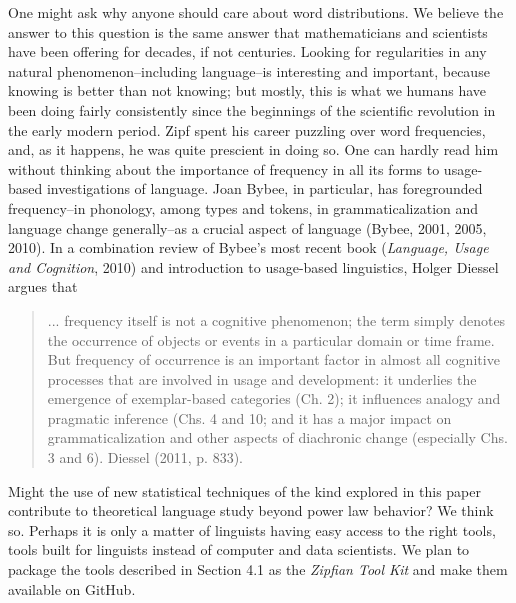 \documentclass[12pt]{article}
\begin{document}
One  might  ask  why  anyone  should  care  about  word  distributions.   We  believe  the  answer to this question is the same answer that mathematicians and scientists have been offering for decades, if not centuries.  Looking for regularities in any natural phenomenon–including language–is interesting and important,  because knowing is better than not knowing;  but mostly, this is what we humans have been doing fairly consistently since the beginnings of the scientific revolution in the early modern period. Zipf spent his career puzzling over word frequencies, and, as it happens, he was quite prescient in doing so.  One can hardly read him without thinking about the importance of frequency in all its forms to usage-based investigations of language.   Joan Bybee, in particular, has foregrounded frequency--in phonology, among types and tokens, in grammaticalization and language change generally--as a crucial aspect of language (Bybee, 2001, 2005, 2010).  In a combination review of Bybee's most recent book (\emph{Language, Usage and Cognition}, 2010) and introduction to usage-based linguistics, Holger Diessel argues that
\begin{quote}
... frequency itself is not a cognitive phenomenon; the term simply denotes the occurrence of objects or events in a particular domain or time frame. But frequency of occurrence is an important factor in almost all cognitive processes that are involved in usage and development: it underlies the emergence of exemplar-based categories (Ch. 2); it influences analogy and pragmatic inference (Chs. 4 and 10; and it has a major impact on grammaticalization and other aspects of diachronic change (especially Chs. 3 and 6).  Diessel (2011, p. 833).
\end{quote}
Might the use of new statistical techniques of the kind explored in this paper contribute to theoretical language study beyond power law behavior?  We think so.  Perhaps it is only a matter of linguists having easy access to the right tools, tools built for linguists instead of computer and data scientists.  We plan to package the tools described in Section 4.1 as the \emph{Zipfian Tool Kit} and make them available on GitHub.
\end{document}
